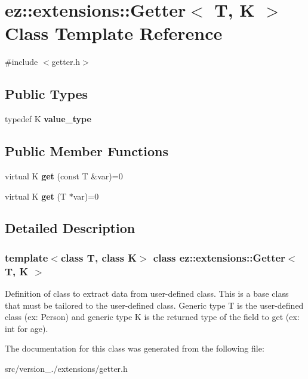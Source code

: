 \hypertarget{classez_1_1extensions_1_1Getter}{}\section{ez\+:\+:extensions\+:\+:Getter$<$ T, K $>$ Class Template Reference}
\label{classez_1_1extensions_1_1Getter}


{\ttfamily \#include $<$getter.\+h$>$}

\subsection*{Public Types}
\begin{DoxyCompactItemize}
\item 
\mbox{\label{classez_1_1extensions_1_1Getter_adc9903c0d88a1e1ce5fff07794226216}} 
typedef K {\bfseries value\+\_\+type}
\end{DoxyCompactItemize}
\subsection*{Public Member Functions}
\begin{DoxyCompactItemize}
\item 
\mbox{\label{classez_1_1extensions_1_1Getter_a93c672147cd87ba9f16c8e04839fc15d}} 
virtual K {\bfseries get} (const T \&var)=0
\item 
\mbox{\label{classez_1_1extensions_1_1Getter_a1418aa8d99912655dafc25248b5fefe7}} 
virtual K {\bfseries get} (T $\ast$var)=0
\end{DoxyCompactItemize}


\subsection{Detailed Description}
\subsubsection*{template$<$class T, class K$>$\newline
class ez\+::extensions\+::\+Getter$<$ T, K $>$}

Definition of class to extract data from user-\/defined class. This is a base class that must be tailored to the user-\/defined class. Generic type T is the user-\/defined class (ex\+: Person) and generic type K is the returned type of the field to get (ex\+: int for age). 

The documentation for this class was generated from the following file\+:\begin{DoxyCompactItemize}
\item 
src/version\+\_./extensions/getter.\+h\end{DoxyCompactItemize}
